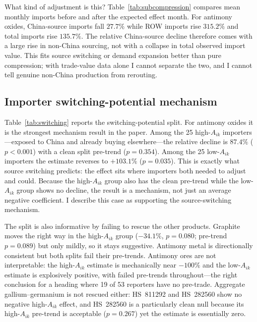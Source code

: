 \documentclass[12pt,a4paper]{article}
\begin{document}


What kind of adjustment is this? Table~\ref{tab:subcompression} compares mean
monthly imports before and after the expected effect month. For antimony oxides,
China-source imports fall $27.7\%$ while ROW imports rise $315.2\%$ and total
imports rise $135.7\%$. The relative China-source decline therefore comes with a
large rise in non-China sourcing, not with a collapse in total observed import value.
This fits source switching or demand expansion better than pure compression; with
trade-value data alone I cannot separate the two, and I cannot tell genuine
non-China production from rerouting.



\subsection{Importer switching-potential mechanism}\label{sec:mechanism}

Table~\ref{tab:switching} reports the switching-potential split. For antimony
oxides it is the strongest mechanism result in the paper. Among the 25
high-$A_{ik}$ importers---exposed to China and already buying elsewhere---the
relative decline is $87.4\%$ ($p<0.001$) with a clean split pre-trend ($p=0.354$).
Among the 25 low-$A_{ik}$ importers the estimate reverses to $+103.1\%$
($p=0.035$). This is exactly what source switching predicts: the effect sits
where importers both needed to adjust and could. Because the high-$A_{ik}$ group
also has the clean pre-trend while the low-$A_{ik}$ group shows no decline, the
result is a mechanism, not just an average negative coefficient. I describe this
case as supporting the source-switching mechanism.



The split is also informative by failing to rescue the other products. Graphite
moves the right way in the high-$A_{ik}$ group ($-34.1\%$, $p=0.080$; pre-trend
$p=0.089$) but only mildly, so it stays suggestive. Antimony metal is
directionally consistent but both splits fail their pre-trends. Antimony ores are
not interpretable: the high-$A_{ik}$ estimate is mechanically near $-100\%$ and
the low-$A_{ik}$ estimate is explosively positive, with failed pre-trends
throughout---the right conclusion for a heading where 19 of 53 reporters have no
pre-trade. Aggregate gallium--germanium is not rescued either: HS~811292 and
HS~282560 show no negative high-$A_{ik}$ effect, and HS~282560 is a particularly
clean null because its high-$A_{ik}$ pre-trend is acceptable ($p=0.267$) yet the
estimate is essentially zero.
\end{document}
